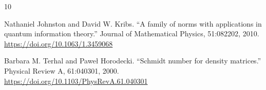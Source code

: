 \documentclass[11pt,reqno]{amsart}
\theoremstyle{plain}
\theoremstyle{remark}
\begin{document}
\begin{thebibliography}{10}

Nathaniel Johnston and David W. Kribs.
``A family of norms with applications in quantum information theory.''
\newblock Journal of Mathematical Physics, 51:082202, 2010.
\newblock \url{https://doi.org/10.1063/1.3459068}

Barbara M. Terhal and Pawe\l{} Horodecki.
``Schmidt number for density matrices.''
\newblock Physical Review A, 61:040301, 2000.
\newblock \url{https://doi.org/10.1103/PhysRevA.61.040301}

\end{thebibliography}
\end{document}
